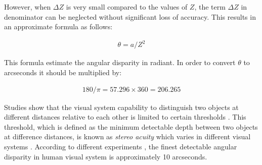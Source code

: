 \documentclass[12pt]{report}
\begin{document}
However, when $\Delta Z$ is very small compared to the values of $Z$, the term $\Delta Z$ in denominator can be neglected without significant loss of accuracy. This results in
an approximate formula as follows:

\begin{align}
\theta = a/Z^{2}
\end{align}

This formula estimate the angular disparity in radiant. In order to convert $\theta$ to arcseconds it should be multiplied by:

\begin{align}
180/\pi = 57.296\times360=206.265
\end{align}

Studies show that the visual system capability to distinguish two objects at different distances relative to each other is limited to certain thresholds \cite{binr83,how95}.
This threshold, which is defined as the minimum detectable depth between two 
objects at difference distances, is known as {\it stereo acuity} which varies in different visual systems \cite{binr83,how95}. According to different
experiments \cite{binr83}, the finest detectable angular disparity in human visual system is approximately 10 arcseconds.






 
\end{document}
